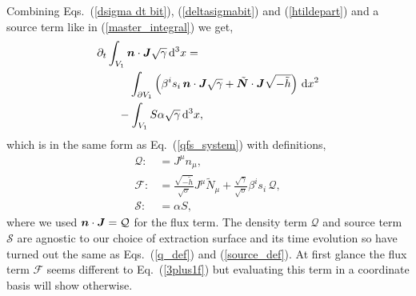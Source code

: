 Combining Eqs.~(\ref{dsigma dt bit}), (\ref{deltasigmabit}) and (\ref{htildepart}) and a source term like in (\ref{master_integral}) we get,
\begin{align}
 \partial_t &\int_{V_1} \boldsymbol{n} \cdot \boldsymbol{J} \sqrt{\gamma} \,\dd^3 x =\nonumber \\
 &\quad\quad\int_{\partial V_1} \left( \beta^i s_i\, \boldsymbol{n} \cdot \boldsymbol{J} \sqrt{\gamma}  + \tilde{\boldsymbol N} \cdot \boldsymbol{J} \sqrt{-\tilde{h}} \right) \, \dd x^2 \nonumber \\
 &\quad-\int_{V_1} S \alpha \sqrt{\gamma} \, \dd^3 x,
\end{align}
which is in the same form as Eq.~(\ref{qfs_system}) with definitions,
\begin{align}
\mathcal{Q} :&= J^\mu n_\mu, \\
\label{unfinished_flux}\mathcal{F} :&= \frac{\sqrt{-\tilde h}}{\sqrt{\sigma}}J^\mu \tilde N_\mu +  \frac{\sqrt{\gamma}}{\sqrt{\sigma}}\beta^i s_i\, \mathcal{Q} , \\
\mathcal{S} :&= \alpha S,
\end{align} 
where we used $\boldsymbol{n} \cdot \boldsymbol{J} = \mathcal{Q}$ for the flux term. The density term $\mathcal{Q}$ and source term $\mathcal{S}$ are agnostic to our choice of extraction surface and its time evolution so have turned out the same as Eqs.~(\ref{q_def}) and (\ref{source_def}). At first glance the flux term $\mathcal{F}$ seems different to Eq.~(\ref{3plus1f}) but evaluating this term in a coordinate basis will show otherwise.


